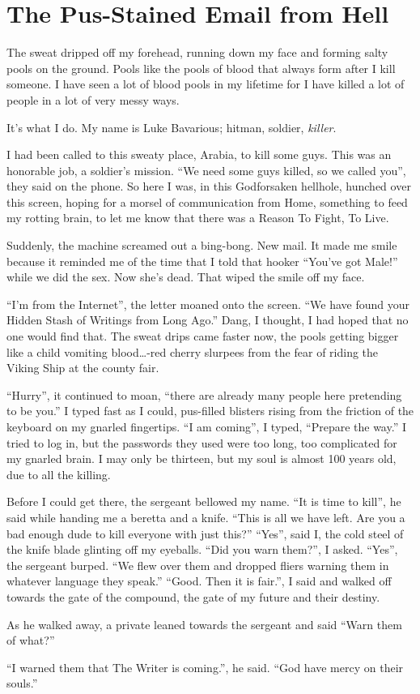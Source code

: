 \chapter{The Pus-Stained Email from Hell}


The sweat dripped off my forehead, running down my face and forming
salty pools on the ground. Pools like the pools of blood that
always form after I kill someone. I have seen a lot of blood pools
in my lifetime for I have killed a lot of people in a lot of very
messy ways.



It's what I do. My name is Luke Bavarious; hitman, soldier,
{\em killer}.



I had been called to this sweaty place, Arabia, to kill some guys.
This was an honorable job, a soldier's mission. ``We need some guys
killed, so we called you'', they said on the phone. So here I was,
in this Godforsaken hellhole, hunched over this screen, hoping for
a morsel of communication from Home, something to feed my rotting
brain, to let me know that there was a Reason To Fight, To
Live.



Suddenly, the machine screamed out a bing-bong. New mail. It made
me smile because it reminded me of the time that I told that hooker
``You've got Male!'' while we did the sex. Now she's dead. That wiped
the smile off my face.



``I'm from the Internet'', the letter moaned onto the screen. ``We
have found your Hidden Stash of Writings from Long Ago.'' Dang, I
thought, I had hoped that no one would find that. The sweat drips
came faster now, the pools getting bigger like a child vomiting
blood{\ldots}-red cherry slurpees from the fear of riding the Viking
Ship at the county fair.



``Hurry'', it continued to moan, ``there are already many people here
pretending to be you.'' I typed fast as I could, pus-filled blisters
rising from the friction of the keyboard on my gnarled fingertips.
``I am coming'', I typed, ``Prepare the way.'' I tried to log in, but
the passwords they used were too long, too complicated for my
gnarled brain. I may only be thirteen, but my soul is almost 100
years old, due to all the killing.



Before I could get there, the sergeant bellowed my name. ``It is
time to kill'', he said while handing me a beretta and a knife.
``This is all we have left. Are you a bad enough dude to kill
everyone with just this?'' ``Yes'', said I, the cold steel of the
knife blade glinting off my eyeballs. ``Did you warn them?'', I
asked. ``Yes'', the sergeant burped. ``We flew over them and dropped
fliers warning them in whatever language they speak.'' ``Good. Then
it is fair.'', I said and walked off towards the gate of the
compound, the gate of my future and their destiny.



As he walked away, a private leaned towards the sergeant and said
``Warn them of what?''



``I warned them that The Writer is coming.'', he said. ``God have
mercy on their souls.'' 
 




